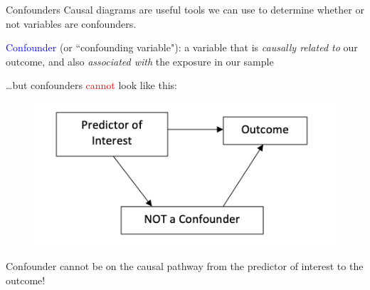 \documentclass[10pt,t]{beamer}
\begin{document}
\begin{frame}{Confounders}
\vspace{-0.3cm}
Causal diagrams are useful tools we can use to determine whether or not variables are confounders.

\vspace{0.3cm}

\textcolor{blue}{Confounder} (or ``confounding variable"): a variable that is \textit{causally related to} our outcome, and also \textit{associated with} the exposure in our sample

\vspace{0.3cm} 

\dots but confounders \textcolor{red}{cannot} look like this:

\vspace{0.2cm}

\begin{figure}
	\centering \includegraphics[scale=0.4]{confounder3.png}
\end{figure}

\vspace{-0.1cm}
\small Confounder cannot be on the causal pathway from the predictor of interest to the outcome!

\end{frame}
\end{document}
